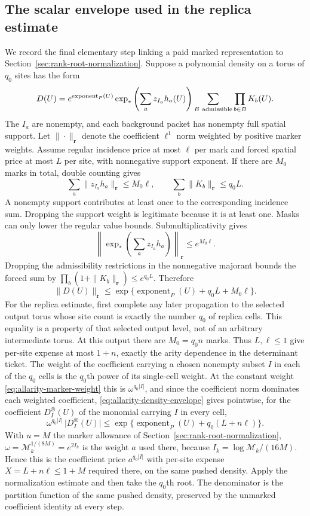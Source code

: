 \subsection{The scalar envelope used in the replica estimate}

We record the final elementary step linking a paid marked representation
to Section~\ref{sec:rank-root-normalization}. Suppose a polynomial
density on a torus of $q_0$ sites has the form
\[
 D(U)=e^{\operatorname{exponent}_P(U)}
       \exp_*\left(\sum_a z_{I_a}h_a(U)\right)
       \sum_{B\ {\rm admissible}}\prod_{b\in B}K_b(U).
\]
The $I_a$ are nonempty, and each background packet has nonempty full
spatial support. Let $\|\cdot\|_{\boldsymbol r}$ denote the coefficient
$\ell^1$ norm weighted by positive marker weights. Assume regular
incidence price at most $\ell$ per mark and forced spatial price at
most $L$ per site, with nonnegative support exponent. If there are
$M_0$ marks in total, double counting gives
\[
 \sum_a\|z_{I_a}h_a\|_{\boldsymbol r}\le M_0\ell,
       \qquad\sum_b\|K_b\|_{\boldsymbol r}\le q_0 L.
\]
A nonempty support contributes at least once to the corresponding
incidence sum. Dropping the support weight is legitimate because it
is at least one. Masks can only lower the regular value bounds.
Submultiplicativity gives
\[
 \left\|\exp_*\left(\sum_a z_{I_a}h_a\right)\right\|_{\boldsymbol r}
       \le e^{M_0\ell}.
\]
Dropping the admissibility restrictions in the nonnegative majorant
bounds the forced sum by
$\prod_b(1+\|K_b\|_{\boldsymbol r})\le e^{q_0 L}$. Therefore
\begin{equation}\label{eq:allarity-density-envelope}
 \|D(U)\|_{\boldsymbol r}
      \le\exp\{\operatorname{exponent}_P(U)+q_0L+M_0\ell\}.
\end{equation}
For the replica estimate, first complete any later propagation to the
selected output torus whose site count is exactly the number $q_0$ of
replica cells. This equality is a property of that selected output
level, not of an arbitrary intermediate torus. At this output there
are $M_0=q_0 n$ marks. Thus $L,\ell\le1$
give per-site expense at most $1+n$, exactly the arity dependence
in the determinant ticket. The weight of the coefficient carrying
a chosen nonempty subset $I$ in each of the $q_0$ cells is the
$q_0$th power of its single-cell weight. At the constant weight
\eqref{eq:allarity-marker-weight} this is $\omega^{q_0|I|}$, and
since the coefficient norm dominates each weighted coefficient,
\eqref{eq:allarity-density-envelope} gives pointwise, for the
coefficient $D_{I}^{\otimes}(U)$ of the monomial carrying $I$ in every
cell,
\[
 \omega^{q_0|I|}\,\bigl|D_{I}^{\otimes}(U)\bigr|
   \le\exp\{\operatorname{exponent}_P(U)+q_0(L+n\ell)\}.
\]
With $u=M$ the marker allowance of
Section~\ref{sec:rank-root-normalization}, $\omega=\mathcal
M_k^{1/(8M)}=e^{2I_k}$ is the weight $a$ used there, because
$I_k=\log\mathcal M_k/(16M)$. Hence this is the coefficient price
$a^{q_0|I|}$ with per-site expense $X=L+n\ell\le1+M$ required there,
on the same pushed density. Apply the normalization
estimate and then take the $q_0$th root. The denominator is the
partition function of the same pushed density, preserved by the
unmarked coefficient identity at every step.

